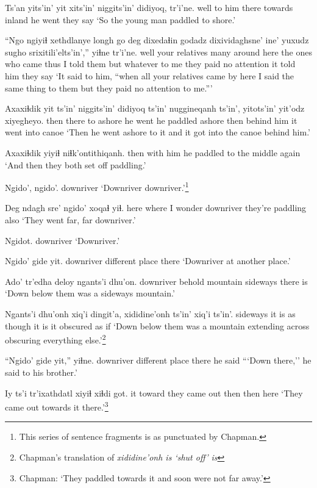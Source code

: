 \documentclass[12pt]{article}
\begin{document}
\gll Ts'an yits'in' yit xits'in' niggits'in'  didiyoq, tr'i'ne.
well {to him} there towards inland {he went} {they say}
\glt `So the young man paddled to shore.'
\glend

\gll ``Ngo {ngiyiɬ  xethdlanye} longh {go deg} dixedaɬin godadz dixividaghsne' ine' yuxudz sugho {srixitili'elts'in',''}  yiɬne tr'i'ne.
well {your relatives} many {around here} {the ones who came} thus {I told them} but whatever {to me} {they paid no attention}  {it told him} {they say}
\glt `It said to him, ``when all your relatives came by here I said the same thing to them but they paid no attention to me.'''
\glend

\gll Axaxiɬdik yit ts'in'  niggits'in' didiyoq ts'in' nuggineqanh ts'in', yitots'in' yit'odz xiyegheyo.
then  there to ashore {he went} {} {he paddled ashore} {} then {behind him} {it went into canoe}
\glt `Then he went ashore to it and it got into the canoe behind him.'
\glend

\gll Axaxiɬdik yiyiɬ  niɬk'ontithiqanh.
then {with him} {he paddled to the middle again}
\glt `And then they both set off paddling.'
\glend

\gll Ngido', ngido'.
downriver {}
\glt `Downriver downriver.'\footnote{This series of sentence fragments is as punctuated by Chapman.}
\glend

\gll Deg ndagh sre'  ngido' xoqaɬ  yiɬ.
here where {I wonder} downriver {they're paddling} also
\glt `They went far, far downriver.'
\glend

\gll Ngidot.
downriver
\glt `Downriver.'
\glend

\gll Ngido'  gide  yit.
downriver {different place} there
\glt `Downriver at another place.'
\glend

\gll Ado' tr'edha deloy  ngants'i dhu'on.
downriver behold  mountain sideways {there is}
\glt `Down below them was a sideways mountain.'
\glend

\gll Ngants'i dhu'onh xiq'i dingit'a, xididine'onh ts'in' xiq'i ts'in'.
sideways {it is} {as though} {it is} {it obscured} {} {as if}
\glt `Down below them was a mountain extending across obscuring everything else.'\footnote{Chapman's translation of \em xididine'onh \em is `shut off' is }
\glend

\gll ``Ngido' gide yit,'' yiɬne.
downriver {different place} there {he said}
\glt ```Down there,'' he said to his brother.'
\glend

\gll Iy ts'i tr'ixathdatl xiyiɬ xiɬdi got.
it toward {they came out} then then here
\glt `They came out towards it there.'\footnote{Chapman: `They paddled towards it and soon were not far away.'}
\glend
\end{document}
